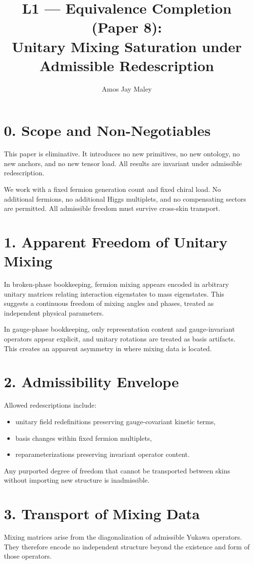 ﻿\documentclass[11pt]{article}
\title{L1 --- Equivalence Completion (Paper 8):\\
Unitary Mixing Saturation under Admissible Redescription}
\author{Amos Jay Maley}
\date{}
\begin{document}
\maketitle

\section*{0. Scope and Non-Negotiables}
This paper is eliminative. It introduces no new primitives, no new ontology,
no new anchors, and no new tensor load.
All results are invariant under admissible redescription.

We work with a fixed fermion generation count and fixed chiral load.
No additional fermions, no additional Higgs multiplets,
and no compensating sectors are permitted.
All admissible freedom must survive cross-skin transport.

\section*{1. Apparent Freedom of Unitary Mixing}
In broken-phase bookkeeping,
fermion mixing appears encoded in arbitrary unitary matrices
relating interaction eigenstates to mass eigenstates.
This suggests a continuous freedom of mixing angles and phases,
treated as independent physical parameters.

In gauge-phase bookkeeping,
only representation content and gauge-invariant operators appear explicit,
and unitary rotations are treated as basis artifacts.
This creates an apparent asymmetry in where mixing data is located.

\section*{2. Admissibility Envelope}
Allowed redescriptions include:
\begin{itemize}
\item unitary field redefinitions preserving gauge-covariant kinetic terms,
\item basis changes within fixed fermion multiplets,
\item reparameterizations preserving invariant operator content.
\end{itemize}

Any purported degree of freedom that cannot be transported between skins
without importing new structure is inadmissible.

\section*{3. Transport of Mixing Data}
Mixing matrices arise from the diagonalization of admissible Yukawa operators.
They therefore encode no independent structure beyond
the existence and form of those operators.
\end{document}
